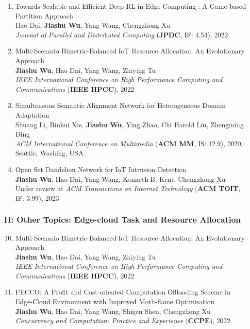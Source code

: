 \documentclass[letterpaper,11pt]{article}
\begin{document}
\begin{enumerate}
  \item Towards Scalable and Efficient Deep-RL in Edge Computing : A Game-based Partition Approach\\
  Hao Dai, \textbf{Jiashu Wu}, Yang Wang\textsuperscript{\Letter}, Chengzhong Xu\\
  \textit{Journal of Parallel and Distributed Computing} (\textbf{JPDC}, IF: 4.54), 2022

  \item Multi-Scenario Bimetric-Balanced IoT Resource Allocation: An Evolutionary Approach\\
  \textbf{Jiashu Wu}, Hao Dai, Yang Wang\textsuperscript{\Letter}, Zhiying Tu\\
  \textit{IEEE International Conference on High Performance Computing and Communications} (\textbf{IEEE HPCC}), 2022

  \item Simultaneous Semantic Alignment Network for Heterogeneous Domain Adaptation\\
  Shuang Li, Binhui Xie, \textbf{Jiashu Wu}, Ying Zhao, Chi Harold Liu\textsuperscript{\Letter}, Zhengming Ding\\
  \textit{ACM International Conference on Multimedia} (\textbf{ACM MM}, IS: 12.9), 2020, Seattle, Washing, USA

  \item Open Set Dandelion Network for IoT Intrusion Detection\\
  \textbf{Jiashu Wu}, Hao Dai, Yang Wang\textsuperscript{\Letter}, Kenneth B. Kent, Chengzhong Xu\\
  Under review at \textit{ACM Transactions on Internet Technology} (\textbf{ACM TOIT}, IF: 3.99), 2023
\end{enumerate}

\iffalse
\subsubsection*{II: Other Topics: Edge-cloud Task and Resource Allocation}
\begin{enumerate}
  \setcounter{enumi}{9}
  \item Multi-Scenario Bimetric-Balanced IoT Resource Allocation: An Evolutionary Approach\\
  \textbf{Jiashu Wu}, Hao Dai, Yang Wang\textsuperscript{\Letter}, Zhiying Tu\\
  \textit{IEEE International Conference on High Performance Computing and Communications} (\textbf{IEEE HPCC}), 2022

  \item PECCO: A Profit and Cost-oriented Computation Offloading Scheme in Edge-Cloud Environment with Improved Moth-flame Optimisation\\
  \textbf{Jiashu Wu}, Hao Dai, Yang Wang\textsuperscript{\Letter}, Shigen Shen, Chengzhong Xu\\
  \textit{Concurrency and Computation: Practice and Experience} (\textbf{CCPE}), 2022
\end{enumerate}
\end{document}
